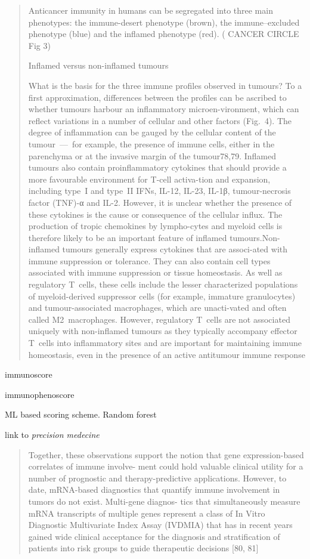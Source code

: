 \documentclass[12pt,]{book}
\theoremstyle{definition}
\theoremstyle{definition}
\theoremstyle{definition}
\theoremstyle{remark}
\begin{document}
\begin{quote}
Anticancer immunity in humans can be segregated into three main
phenotypes: the immune-desert phenotype (brown), the immune--excluded
phenotype (blue) and the inflamed phenotype (red). (\citet{IMMUNE}
CANCER CIRCLE Fig 3)

Inflamed versus non-inflamed tumours

What is the basis for the three immune profiles observed in tumours? To
a first approximation, differences between the profiles can be ascribed
to whether tumours harbour an inflammatory microen-vironment, which can
reflect variations in a number of cellular and other factors (Fig.~4).
The degree of inflammation can be gauged by the cellular content of the
tumour~---~for example, the presence of immune cells, either in the
parenchyma or at the invasive margin of the tumour78,79. Inflamed
tumours also contain proinflammatory cytokines that should provide a
more favourable environment for T-cell activa-tion and expansion,
including type~I and type~II IFNs, IL-12, IL-23, IL-1β, tumour-necrosis
factor (TNF)-α and IL-2. However, it is unclear whether the presence of
these cytokines is the cause or consequence of the cellular influx. The
production of tropic chemokines by lympho-cytes and myeloid cells is
therefore likely to be an important feature of inflamed
tumours.Non-inflamed tumours generally express cytokines that are
associ-ated with immune suppression or tolerance. They can also contain
cell types associated with immune suppression or tissue homeostasis. As
well as regulatory T~cells, these cells include the lesser characterized
populations of myeloid-derived suppressor cells (for example, immature
granulocytes) and tumour-associated macrophages, which are unacti-vated
and often called M2~macrophages. However, regulatory T~cells are not
associated uniquely with non-inflamed tumours as they typically
accompany effector T~cells into inflammatory sites and are important for
maintaining immune homeostasis, even in the presence of an active
antitumour immune response
\end{quote}

immunoscore

immunophenoscore

ML based scoring scheme. Random forest

link to \emph{precision medecine}

\begin{quote}
Together, these observations support the notion that gene
expression-based correlates of immune involve- ment could hold valuable
clinical utility for a number of prognostic and therapy-predictive
applications. However, to date, mRNA-based diagnostics that quantify
immune involvement in tumors do not exist. Multi-gene diagnos- tics that
simultaneously measure mRNA transcripts of multiple genes represent a
class of In Vitro Diagnostic Multivariate Index Assay (IVDMIA) that has
in recent years gained wide clinical acceptance for the diagnosis and
stratification of patients into risk groups to guide therapeutic
decisions {[}80, 81{]}
\end{quote}
\end{document}
